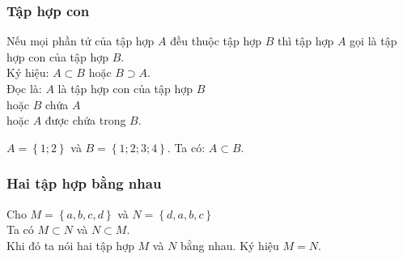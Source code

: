 \begin{tomtat}
	\subsubsection{Tập hợp con}
Nếu mọi phần tử của tập hợp $A$ đều thuộc tập hợp $B$ thì tập hợp $A$ gọi là tập hợp con của tập hợp $B$.\vspace{0,3cm}\\
Ký hiệu: $A \subset B$ hoặc $B \supset A$.\vspace{0,3cm}\\
Đọc là: $A$ là tập hợp con của tập hợp $B$\\  
\hspace*{1.5cm} hoặc $B$ chứa $A$  \\
\hspace*{1.5cm} hoặc $A$ được chứa trong $B$.  \\
\begin{vd}$A = \left\{ {1;2} \right\}$ và $B = \left\{ {1;2;3;4} \right\}$. Ta có: $A \subset B$.
\end{vd}
	\subsubsection{Hai tập hợp bằng nhau}
Cho $M = \left\{ {a,b,c,d} \right\}$ và $N = \left\{ {d,a,b,c} \right\}$\\
Ta có $M \subset N$ và $N \subset M$.\\
Khi đó ta nói hai tập hợp $M$ và $N$ bằng nhau. Ký hiệu $M = N$. 
\end{tomtat}

